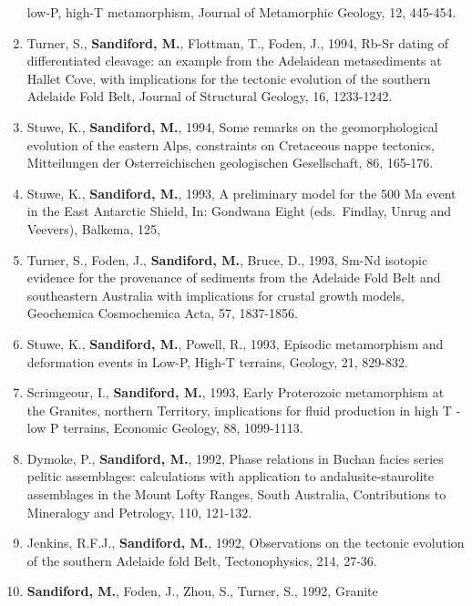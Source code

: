 \documentclass[
]{article}
\begin{document}
\begin{enumerate}
  low-P, high-T metamorphism, Journal of Metamorphic Geology, 12,
  445-454. 
\item
  Turner, S., \textbf{Sandiford, M.}, Flottman, T., Foden, J., 1994,
  Rb-Sr dating of differentiated cleavage: an example from the
  Adelaidean metasediments at Hallet Cove, with implications for the
  tectonic evolution of the southern Adelaide Fold Belt, Journal of
  Structural Geology, 16, 1233-1242. 
\item
  Stuwe, K., \textbf{Sandiford, M.}, 1994, Some remarks on the
  geomorphological evolution of the eastern Alps, constraints on
  Cretaceous nappe tectonics, Mitteilungen der Osterreichischen
  geologischen Gesellschaft, 86, 165-176. 
\item
  Stuwe, K., \textbf{Sandiford, M.}, 1993, A preliminary model for the
  500 Ma event in the East Antarctic Shield, In: Gondwana Eight
  (eds.~Findlay, Unrug and Veevers), Balkema, 125,
\item
  Turner, S., Foden, J., \textbf{Sandiford, M.}, Bruce, D., 1993, Sm-Nd
  isotopic evidence for the provenance of sediments from the Adelaide
  Fold Belt and southeastern Australia with implications for crustal
  growth models, Geochemica Cosmochemica Acta, 57, 1837-1856.
\item
  Stuwe, K., \textbf{Sandiford, M.}, Powell, R., 1993, Episodic
  metamorphism and deformation events in Low-P, High-T terrains,
  Geology, 21, 829-832. 
\item
  Scrimgeour, I., \textbf{Sandiford, M.}, 1993, Early Proterozoic
  metamorphism at the Granites, northern Territory, implications for
  fluid production in high T - low P terrains, Economic Geology, 88,
  1099-1113. 
\item
  Dymoke, P., \textbf{Sandiford, M.}, 1992, Phase relations in Buchan
  facies series pelitic assemblages: calculations with application to
  andalusite-staurolite assemblages in the Mount Lofty Ranges, South
  Australia, Contributions to Mineralogy and Petrology, 110, 121-132.
\item
  Jenkins, R.F.J., \textbf{Sandiford, M.}, 1992, Observations on the
  tectonic evolution of the southern Adelaide fold Belt, Tectonophysics,
  214, 27-36. 
\item
  \textbf{Sandiford, M.}, Foden, J., Zhou, S., Turner, S., 1992, Granite

\end{enumerate}
\end{document}
